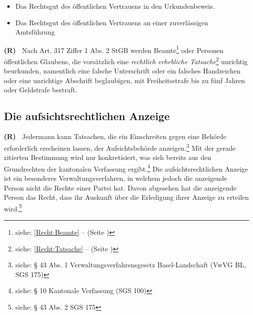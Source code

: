 \documentclass[paper=a4,fontsize=12pt, oneside, numbers=noenddot]{scrbook}
\newcounter{rz}
\newcommand{\Rz}{
	\addtocounter{rz}{1}\textbf{(R\arabic{rz})~}
}
\begin{document}
\begin{itemize}[noitemsep]\setlength\itemsep{0.3em}
\item Das Rechtsgut des öffentlichen Vertrauens in den Urkundenbeweis.
\item Das Rechtsgut des öffentlichen Vertrauens an einer zuverlässigen Amtsführung
\end{itemize} 

\Rz Nach Art. 317 Ziffer 1 Abs. 2 StGB werden Beamte\footnote{siehe: \ref{Recht:Beamte} --  (Seite \pageref{Recht:Beamte})} oder Personen öffentlichen Glaubens, die vorsätzlich eine \textit{rechtlich erhebliche Tatsache}\footnote{siehe: \ref{Recht:Tatsache} --  (Seite \pageref{Recht:Tatsache})} unrichtig beurkunden, namentlich eine falsche Unterschrift oder ein falsches Handzeichen oder eine unrichtige Abschrift beglaubigen, mit Freiheitsstrafe bis zu fünf Jahren oder Geldstrafe bestraft.






\subsection{Die aufsichtsrechtlichen Anzeige}\label{section:AufsichtsrechtlicheAnzeige}
\Rz Jedermann kann Tatsachen, die ein Einschreiten gegen eine Behörde erforderlich erscheinen lassen, der Aufsichtsbehörde anzeigen.\footnote{siehe: § 43 Abs. 1 Verwaltungsverfahrensgesetz Basel-Landschaft (VwVG BL, SGS 175)} Mit der gerade zitierten Bestimmung wird nur konkretisiert, was sich bereits aus den Grundrechten der kantonalen Verfassung ergibt.\footnote{siehe: § 10 Kantonale Verfassung (SGS 100)} Die aufsichtsrechtlichen Anzeige ist ein besonderes Verwaltungsverfahren, in welchem jedoch die anzeigende Person nicht die Rechte einer Partei hat. Davon abgesehen hat die anzeigende Person das Recht, dass ihr Auskunft über die Erledigung ihrer Anzeige zu erteilen wird.\footnote{siehe: § 43 Abs. 2 SGS 175} 
\end{document}
